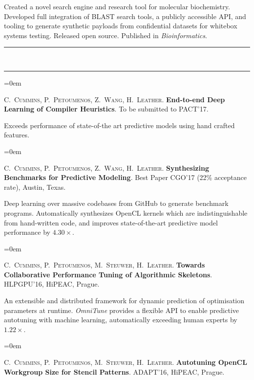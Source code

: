 \documentclass[a4paper,11pt,hidelinks]{scrartcl}
\newcommand{\MarginText}[1]{\marginpar{\raggedleft\itshape\normalsize#1}}
\newcommand{\Title}[1]{\noindent\rule{15cm}{0.4pt}\vspace{-.45em}\\
\noindent\spacedlowsmallcaps{\color{titlecolour}{#1}}

\vspace{-.85em}\noindent\rule{15cm}{0.4pt}\vspace{.2em}}
\newcommand{\Description}[1]{\hangindent=0em\hangafter=0%
\noindent\normalsize{#1}\vspace{1em}}
\newcommand{\Publication}[5]{\Description{\MarginText{#1}#2. \textbf{\href{#5}{#3}}. #4.}}
\begin{document}
\begin{cv}
{  \noindent %
  Created a novel search engine and research tool for molecular biochemistry. Developed full integration of BLAST search tools, a publicly accessible API, and tooling to generate synthetic payloads from confidential datasets for whitebox systems testing. Released open source. Published in \textit{Bioinformatics}.%
}

\Title{Publications}

\Description{\MarginText{\textit{(in preparation)}}C.\ \textsc{Cummins}, P.\
  \textsc{Petoumenos}, Z.\ \textsc{Wang}, H.\
  \textsc{Leather}. \textbf{End-to-end Deep Learning of Compiler Heuristics}. To be submitted to PACT'17.\@
  \newline\vspace{-.8em}

  \noindent %
  Exceeds performance of state-of-the art predictive models using hand crafted features.%
}

\Description{\MarginText{2017}C.\ \textsc{Cummins}, P.\
  \textsc{Petoumenos}, Z.\ \textsc{Wang}, H.\
  \textsc{Leather}. \textbf{Synthesizing Benchmarks for Predictive Modeling}. Best Paper CGO'17 (22\% acceptance rate), Austin, Texas.\@
  \newline\vspace{-.8em}

  \noindent %
  Deep learning over massive codebases from GitHub to generate benchmark programs. Automatically synthesizes OpenCL kernels which are indistinguishable from hand-written code, and improves state-of-the-art predictive model performance by $4.30\times$.%
}

\Description{\MarginText{2016}C.\ \textsc{Cummins}, P.\
  \textsc{Petoumenos}, M.\ \textsc{Steuwer}, H.\
  \textsc{Leather}. \textbf{Towards Collaborative Performance Tuning
    of Algorithmic Skeletons}. HLPGPU'16, HiPEAC, Prague.\@
  \newline\vspace{-.8em}

  \noindent %
  An extensible and distributed framework for dynamic prediction of optimisation parameters at runtime. \emph{OmniTune} provides a flexible API to enable predictive autotuning with machine learning, automatically exceeding human experts by $1.22\times$.%
}

\Description{\MarginText{2016}C.\ \textsc{Cummins}, P.\
  \textsc{Petoumenos}, M.\ \textsc{Steuwer}, H.\
  \textsc{Leather}. \textbf{Autotuning OpenCL Workgroup Size for
    Stencil Patterns}. ADAPT'16, HiPEAC, Prague.\@ \newline\vspace{-.8em}

}
\end{cv}
\end{document}
